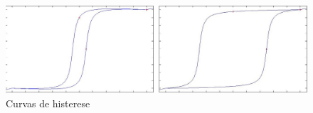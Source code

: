 \begin{figure}[h]
\caption{\label{fig_histerese}Curvas de histerese}
\begin{center}
\includegraphics[scale=0.5]{images/histerese.png}
\end{center}
\end{figure}